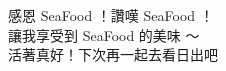 \renewcommand{\acknowledgementname}{誌\hspace{2em}謝}
\clearpage
{}
\begin{acknowledgements}

感恩 SeaFood ！讚嘆 SeaFood ！\\
讓我享受到 SeaFood 的美味 ～\\
活著真好！下次再一起去看日出吧\\

\end{acknowledgements} 